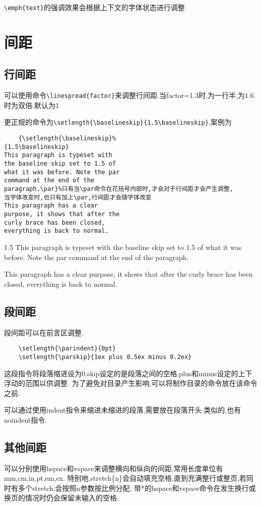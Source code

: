 \documentclass[a4paper,11pt]{article}%
\begin{document}
\verb|\emph{text}|的强调效果会根据上下文的字体状态进行调整
\section{间距}
\subsection{行间距}
可以使用命令\verb|\linespread{factor}|来调整行间距.当factor=1.3时,为一行半,为1.6时为双倍.默认为1

更正规的命令为\verb|\setlength{\baselineskip}{1.5\baselineskip}|,案例为
\begin{verbatim}
    {\setlength{\baselineskip}%
{1.5\baselineskip}
This paragraph is typeset with
the baseline skip set to 1.5 of
what it was before. Note the par
command at the end of the
paragraph.\par}%只有当\par命令在花括号内部时,才会对于行间距才会产生调整,
当字体改变时,也只有加上\par,行间距才会随字体改变
This paragraph has a clear
purpose, it shows that after the
curly brace has been closed,
everything is back to normal.
\end{verbatim}
{\setlength{\baselineskip}%
{1.5\baselineskip}
This paragraph is typeset with
the baseline skip set to 1.5 of
what it was before. Note the par
command at the end of the
paragraph.\par}
This paragraph has a clear
purpose, it shows that after the
curly brace has been closed,
everything is back to normal.

\subsection{段间距}
段间距可以在前言区调整.
\begin{verbatim}
    \setlength{\parindent}{0pt}
    \setlength{\parskip}{1ex plus 0.5ex minus 0.2ex}
\end{verbatim}
这段指令将段落缩进设为0.skip设定的是段落之间的空格,plus和minus设定的上下浮动的范围以供调整.
为了避免对目录产生影响,可以将制作目录的命令放在该命令之前.

可以通过使用indent指令来缩进未缩进的段落,需要放在段落开头.类似的,也有noindent指令.
\subsection{其他间距}
可以分别使用hspace和vspace来调整横向和纵向的间距,常用长度单位有mm,cm,in,pt,em,ex.
特别地,stretch\{n\}会自动填充空格,直到充满整行或整页,若同时有多个stretch,会按照n参数按比例分配.
带*的hspace和vspace命令在发生换行或换页的情况时仍会保留未输入的空格.
\end{document}
